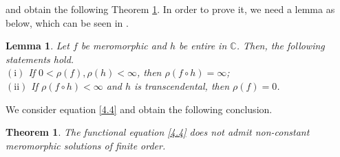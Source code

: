\documentclass[sn-mathphys-num]{sn-jnl}%
\theoremstyle{thmstyleone}%
\newtheorem{theorem}{Theorem}%
\theoremstyle{thmstyletwo}%
\newtheorem{lemma}{Lemma}
\theoremstyle{thmstylethree}%
\begin{document}
and obtain the following Theorem \ref{thm6.5}. In order to prove it, we need a lemma as below, which can be seen in \cite{EF}.
\begin{lemma}\cite{EF}\label{l4.1}
	Let \(f\) be meromorphic and \(h\) be entire in \(\mathbb{C}\). Then, the following statements hold.\\
	\(\mathrm{(i)}\) If \(0<\rho(f),\rho(h)<\infty\), then \(\rho(f\circ h)=\infty\);\\
	\(\mathrm{(ii)}\) If \(\rho(f\circ h)<\infty\) and \(h\) is transcendental, then \(\rho(f)=0\).
\end{lemma}
\indent We consider equation \eqref{4.4} and obtain the following conclusion.
\begin{theorem}\label{thm6.5}
	The functional equation \eqref{4.4} does not admit non-constant meromorphic solutions of finite order.	
\end{theorem}
\end{document}
